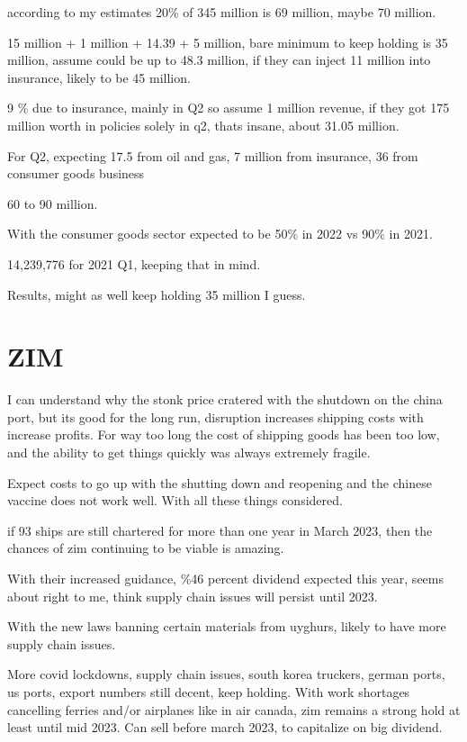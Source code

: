 according to my estimates 20\% of 345 million is 69 million, maybe 70 million.

15 million + 1 million + 14.39 + 5 million, bare minimum to keep holding is 35 million, assume could be up to 48.3 million, if they can inject 11 million into insurance, likely to be 45 million. 

9 \% due to insurance, mainly in Q2 so assume 1 million revenue, if they got 175 million worth in policies solely in q2, thats insane, about 31.05 million.

For Q2, expecting 17.5 from oil and gas, 7 million from insurance, 36 from consumer goods business

60 to 90 million.

With the consumer goods sector expected to be 50\% in 2022 vs 90\% in 2021.

14,239,776 for 2021 Q1, keeping that in mind.

Results, might as well keep holding 35 million I guess.

\section{ZIM}

I can understand why the stonk price cratered with the shutdown on the china port, but its good for the long run, disruption increases shipping costs with increase profits. For way too long the cost of shipping goods has been too low, and the ability to get things quickly was always extremely fragile.

Expect costs to go up with the shutting down and reopening and the chinese vaccine does not work well.
With all these things considered.

if 93 ships are still chartered for more than one year in March 2023, then the chances of zim continuing to be viable is amazing.

With their increased guidance, \%46 percent dividend expected this year, seems about right to me, think supply chain issues will persist until 2023.

With the new laws banning certain materials from uyghurs, likely to have more supply chain issues.

More covid lockdowns, supply chain issues, south korea truckers, german ports, us ports, export numbers still decent, keep holding. With work shortages cancelling ferries and/or airplanes like in air canada, zim remains a strong hold at least until mid 2023. Can sell before march 2023, to capitalize on big dividend.


